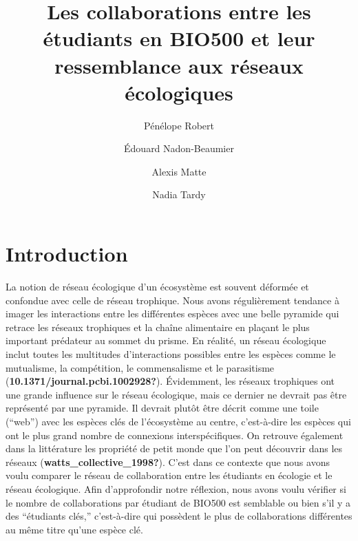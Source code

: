 \documentclass[9pt,twocolumn,twoside,]{pnas-new}
\title{Les collaborations entre les étudiants en BIO500 et leur
ressemblance aux réseaux écologiques}
\author[a]{Pénélope Robert}
\author[a]{Édouard Nadon-Beaumier}
\author[a]{Alexis Matte}
\author[a]{Nadia Tardy}
\affil[a]{Université de Sherbrooke, Départment de biologie, 2500
Boulevard de l'Université, Sherbrooke, Québec, G1V 0A9}
\begin{document}
\verticaladjustment{-2pt}



\maketitle
\thispagestyle{firststyle}


\acknow{}

\hypertarget{introduction}{%
\section{Introduction}\label{introduction}}

La notion de réseau écologique d'un écosystème est souvent déformée et
confondue avec celle de réseau trophique. Nous avons régulièrement
tendance à imager les interactions entre les différentes espèces avec
une belle pyramide qui retrace les réseaux trophiques et la chaîne
alimentaire en plaçant le plus important prédateur au sommet du prisme.
En réalité, un réseau écologique inclut toutes les multitudes
d'interactions possibles entre les espèces comme le mutualisme, la
compétition, le commensalisme et le parasitisme
(\textbf{10.1371/journal.pcbi.1002928?}). Évidemment, les réseaux
trophiques ont une grande influence sur le réseau écologique, mais ce
dernier ne devrait pas être représenté par une pyramide. Il devrait
plutôt être décrit comme une toile (``web'') avec les espèces clés de
l'écosystème au centre, c'est-à-dire les espèces qui ont le plus grand
nombre de connexions interspécifiques. On retrouve également dans la
littérature les propriété de petit monde que l'on peut découvrir dans
les réseaux (\textbf{watts\_collective\_1998?}). C'est dans ce contexte
que nous avons voulu comparer le réseau de collaboration entre les
étudiants en écologie et le réseau écologique. Afin d'approfondir notre
réflexion, nous avons voulu vérifier si le nombre de collaborations par
étudiant de BIO500 est semblable ou bien s'il y a des ``étudiants
clés,'' c'est-à-dire qui possèdent le plus de collaborations différentes
au même titre qu'une espèce clé.
\end{document}
